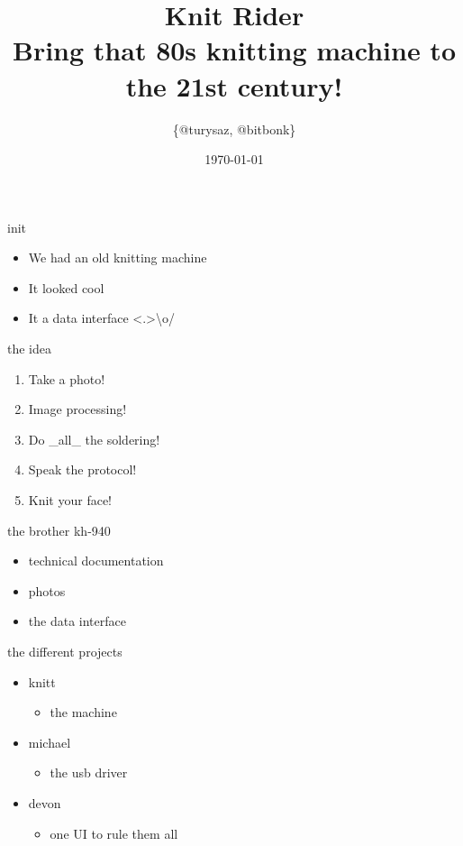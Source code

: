 \documentclass{beamer}
\author{\{@turysaz, @bitbonk\}}
\title{\Huge{Knit Rider}\\
    \large{Bring that 80s knitting machine to the 21st century!}
}
\date{\today{}}
\begin{document}
\maketitle

\begin{frame}{init}
    \begin{itemize}[<+->]
        \item We had an old knitting machine
        \item It looked cool
        \item It  a data interface
              \only<.>{\alert{\textbackslash{}o/}}
    \end{itemize}
\end{frame}

\begin{frame}{the idea}
    \begin{enumerate}[<+->]
        \item Take a photo!
        \item Image processing!
        \item Do \_all\_ the soldering!
        \item Speak the protocol!
        \item Knit your face!
    \end{enumerate}
\end{frame}

\begin{frame}{the brother kh-940}
    \begin{itemize}%
        \item technical documentation
        \item photos
        \item the data interface
    \end{itemize}
\end{frame}

\begin{frame}{the different projects}
    \begin{itemize}
        \item knitt
        \begin{itemize}
            \item the machine
        \end{itemize}

        \item michael
        \begin{itemize}
            \item the usb driver
        \end{itemize}

        \item devon
        \begin{itemize}
            \item one UI to rule them all
        \end{itemize}
      \end{itemize}
\end{frame}
\end{document}
